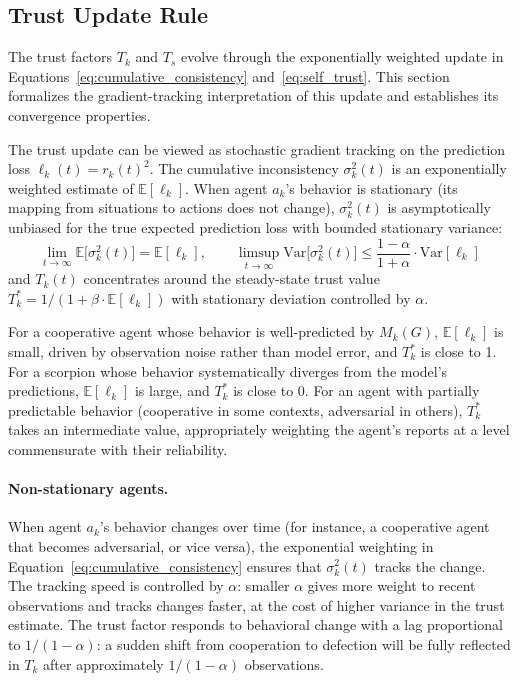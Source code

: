 \subsection{Trust Update Rule}
\label{app:trust_update}

The trust factors $T_k$ and $T_s$ evolve through the exponentially weighted update in Equations~\eqref{eq:cumulative_consistency} and~\eqref{eq:self_trust}. This section formalizes the gradient-tracking interpretation of this update and establishes its convergence properties.

The trust update can be viewed as stochastic gradient tracking on the prediction loss $\ell_k(t) = r_k(t)^2$. The cumulative inconsistency $\sigma_k^2(t)$ is an exponentially weighted estimate of $\mathbb{E}[\ell_k]$. When agent $a_k$'s behavior is stationary (its mapping from situations to actions does not change), $\sigma_k^2(t)$ is asymptotically unbiased for the true expected prediction loss with bounded stationary variance:
\begin{equation}
\label{eq:convergence}
\lim_{t \to \infty} \mathbb{E}\bigl[\sigma_k^2(t)\bigr] = \mathbb{E}[\ell_k],
\qquad
\limsup_{t \to \infty} \mathrm{Var}\bigl[\sigma_k^2(t)\bigr] \leq \frac{1 - \alpha}{1 + \alpha} \cdot \mathrm{Var}[\ell_k]
\end{equation}
and $T_k(t)$ concentrates around the steady-state trust value $T_k^* = 1 / (1 + \beta \cdot \mathbb{E}[\ell_k])$ with stationary deviation controlled by $\alpha$.

For a cooperative agent whose behavior is well-predicted by $M_k(G)$, $\mathbb{E}[\ell_k]$ is small, driven by observation noise rather than model error, and $T_k^*$ is close to 1. For a scorpion whose behavior systematically diverges from the model's predictions, $\mathbb{E}[\ell_k]$ is large, and $T_k^*$ is close to 0. For an agent with partially predictable behavior (cooperative in some contexts, adversarial in others), $T_k^*$ takes an intermediate value, appropriately weighting the agent's reports at a level commensurate with their reliability.

\paragraph{Non-stationary agents.} When agent $a_k$'s behavior changes over time (for instance, a cooperative agent that becomes adversarial, or vice versa), the exponential weighting in Equation~\eqref{eq:cumulative_consistency} ensures that $\sigma_k^2(t)$ tracks the change. The tracking speed is controlled by $\alpha$: smaller $\alpha$ gives more weight to recent observations and tracks changes faster, at the cost of higher variance in the trust estimate. The trust factor responds to behavioral change with a lag proportional to $1/(1 - \alpha)$: a sudden shift from cooperation to defection will be fully reflected in $T_k$ after approximately $1/(1 - \alpha)$ observations.

